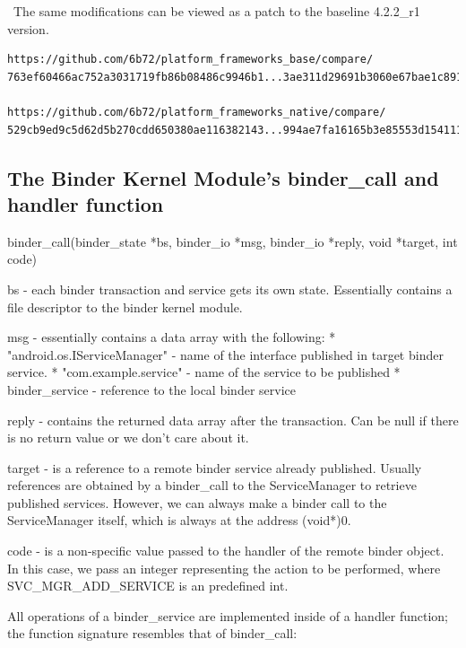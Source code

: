 \documentclass[prodmode]{acmlarge}
\begin{document}
\noindent~The same modifications can be viewed as a patch to the baseline 4.2.2\_r1 version.
\begin{Verbatim}
https://github.com/6b72/platform_frameworks_base/compare/
763ef60466ac752a3031719fb86b08486c9946b1...3ae311d29691b3060e67bae1c891fb8fbbc1be0f

https://github.com/6b72/platform_frameworks_native/compare/
529cb9ed9c5d62d5b270cdd650380ae116382143...994ae7fa16165b3e85553d154111df0a2f5a5af3
\end{Verbatim}

\pagebreak[4]
\subsection{The Binder Kernel Module's binder\_call and handler function}
\label{app:binder_call}

\begin{snippet}
binder_call(binder_state *bs, binder_io *msg, binder_io *reply, void *target, int code)

bs -     each binder transaction and service gets its own state.
         Essentially contains a file descriptor to the binder kernel module.

msg -    essentially contains a data array with the following:
         * "android.os.IServiceManager" - name of the interface published in
                                          target binder service.
          * "com.example.service"       - name of the service to be  published
          * binder_service              - reference to the local binder
                                          service

reply -   contains the returned data array after the transaction. Can be null
          if there is no return value or we don't care about it.

target -  is a reference to a remote binder service already published. Usually
          references are obtained by a binder_call to the ServiceManager to retrieve
          published services. However, we can always make a binder call to the
          ServiceManager itself, which is always at the address (void*)0.

code -    is a non-specific value passed to the handler of the remote binder object.
          In this case, we pass an integer representing the action to be performed,
          where SVC_MGR_ADD_SERVICE is an predefined int.
\end{snippet}

All operations of a binder\_service are implemented inside of a handler function; the function signature resembles that of binder\_call:
\end{document}
